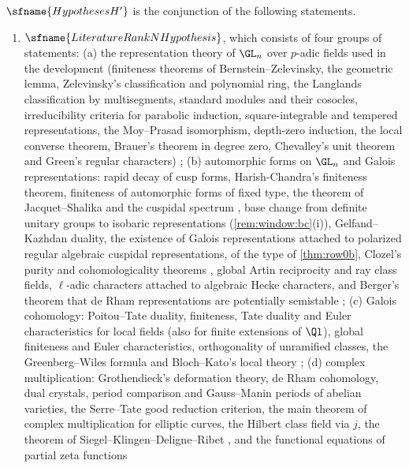\begin{definition}\label{pf:vwin-he:H}
$\sfname{HypothesesH'}$ is the conjunction of the following statements.
\begin{enumerate}[label=(H\arabic*)]
\item\label{pf:vwin-he:H1} $\sfname{LiteratureRankNHypothesis}$, which consists of four groups of statements:
 (a) the representation theory of $\GL_n$ over $p$-adic fields used in the development (finiteness theorems of
 Bernstein--Zelevinsky, the geometric lemma, Zelevinsky's classification and polynomial ring, the Langlands
 classification by multisegments, standard modules and their cosocles, irreducibility criteria for parabolic
 induction, square-integrable and tempered representations, the Moy--Prasad isomorphism, depth-zero induction,
 the local converse theorem, Brauer's theorem in degree zero, Chevalley's unit theorem and Green's regular
 characters) \cite{BernsteinZelevinsky1977,Zelevinsky1980,MoyPrasad1994};
 (b) automorphic forms on $\GL_n$ and Galois representations: rapid decay of cusp forms, Harish-Chandra's
 finiteness theorem, finiteness of automorphic forms of fixed type, the theorem of Jacquet--Shalika and the
 cuspidal spectrum \cite{JacquetShalika1981}, base change from definite unitary groups to isobaric representations
 (\cref{rem:window:bc}(i)), Gelfand--Kazhdan duality, the existence of Galois representations attached to
 polarized regular algebraic cuspidal representations, of the type of \cref{thm:row0b}, Clozel's purity
 and cohomologicality theorems \cite{Clozel1990}, global Artin reciprocity and ray class fields, $\ell$-adic
 characters attached to algebraic Hecke characters, and Berger's theorem that de Rham representations are
 potentially semistable \cite{Berger2002};
 (c) Galois cohomology: Poitou--Tate duality, finiteness, Tate duality and Euler characteristics for local fields
 (also for finite extensions of $\Ql$), global finiteness and Euler characteristics, orthogonality of unramified
 classes, the Greenberg--Wiles formula \cite{Wiles1995} and Bloch--Kato's local theory \cite{BlochKato1990};
 (d) complex multiplication: Grothendieck's deformation theory, de Rham cohomology, dual crystals, period
 comparison and Gauss--Manin periods of abelian varieties, the Serre--Tate good reduction criterion, the main
 theorem of complex multiplication for elliptic curves, the Hilbert class field via $j$, the theorem of
 Siegel--Klingen--Deligne--Ribet \cite{DeligneRibet1980}, and the functional equations of partial zeta functions

\end{enumerate}
\end{definition}
